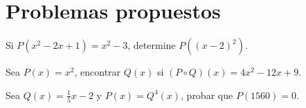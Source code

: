 \section{Problemas propuestos}

\begin{section-problem}
    Si $P(x^2 - 2x + 1) = x^2 - 3$, determine $P((x - 2)^2).$
\end{section-problem}

\begin{section-problem}
    Sea $P(x) = x^2$, encontrar $Q(x)$ si $(P \circ Q)(x) = 4x^2 - 12x + 9$.
\end{section-problem}

\begin{section-problem}
    Sea $Q(x) = \frac{1}{5} x - 2$ y $P(x) = Q^4(x)$, probar que $P(1560) = 0$.
\end{section-problem}

